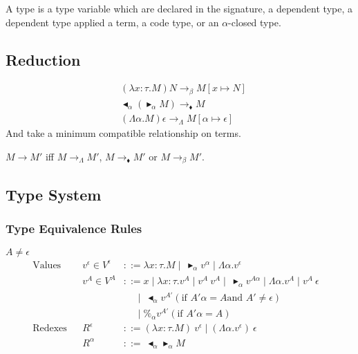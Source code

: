 \documentclass[runningheads]{llncs}
\newcommand{\TB}{\blacktriangleright}
\newcommand{\TBL}{\blacktriangleleft}
\begin{document}
A type is a type variable which are declared in the signature, a dependent type, a dependent type applied a term, a code type, or an $\alpha$-closed type.


\subsection{Reduction}

\begin{definition}[Reduction]
\begin{align*}
    & (\lambda x:\tau.M) N \longrightarrow_\beta M[x \mapsto N] \\
    & \TBL_\alpha (\TB_\alpha M)\longrightarrow_\blacklozenge M \\
    & (\Lambda \alpha.M) \epsilon \longrightarrow_\Lambda M[\alpha \mapsto \epsilon]
\end{align*}
And take a minimum compatible relationship on terms.

    $ M \longrightarrow M'$ iff 
    $ M \longrightarrow_\Lambda M' $, $ M \longrightarrow_\blacklozenge M' $ or $ M \longrightarrow_\beta M' $.
\end{definition}

\subsection{Type System}
\subsubsection{Type Equivalence Rules}

\begin{definition}[Values]
$A \neq \epsilon$\\
\begin{align*}
    \textrm{Values} && v^\epsilon \in V^\epsilon & ::= \lambda x:\tau.M \mid\ \TB_\alpha v^\alpha \mid \Lambda\alpha.v^\epsilon & \\
                    && v^A \in V^A & ::= x \mid \lambda x:\tau.v^A \mid v^A\ v^A \mid\ \TB_\alpha v^{A\alpha} 
                                           \mid \Lambda\alpha.v^A \mid v^A\ \epsilon &\\
                                    &&& \quad\   \mid\ \TBL_\alpha v^{A'} (\text{if } A'\alpha = A \text{and } A' \neq \epsilon) & \\
                                    &&& \quad\   \mid \%_\alpha v^{A'} (\text{if } A'\alpha = A) & \\
    \textrm{Redexes} && R^\epsilon & ::= (\lambda x:\tau.M)\ v^\epsilon \mid (\Lambda\alpha.v^\epsilon)\ \epsilon & \\
                     && R^\alpha & ::=\ \TBL_\alpha \TB_\alpha M & \\
\end{align*}
\end{definition}
\end{document}
